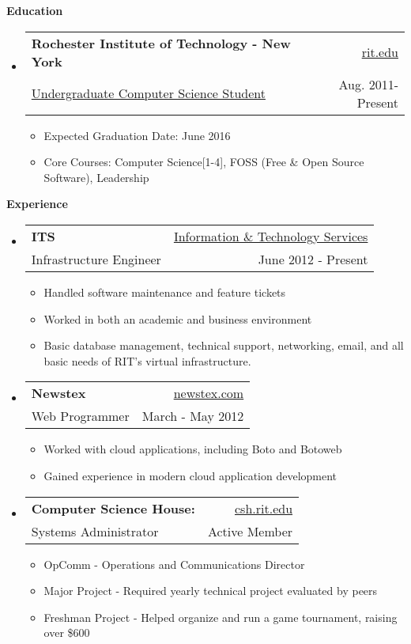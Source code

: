 \documentclass[letterpaper,11pt]{article}
\makeatletter
\newcommand{\resitem}[1]{\item #1 \vspace{-2pt}}
\newcommand{\resheading}[1]{{\large \colorbox{mygrey}{\begin{minipage}{\textwidth}{\textbf{#1 \vphantom{p\^{E}}}}\end{minipage}}}}
\newcommand{\ressubheading}[4]{
\begin{tabular*}{6.5in}{l@{\extracolsep{\fill}}r}
		\textbf{#1} & #2 \\
		{#3} & {#4} \\
\end{tabular*}\vspace{-6pt}}
\makeatother
\begin{document}
\resheading{Education}
	{ \footnotesize
	\begin{itemize}
		\item
			\ressubheading{Rochester Institute of Technology - New York}{\href{http://www.rit.edu/}{rit.edu}}{\href{http://www.cs.rit.edu/}{Undergraduate Computer Science Student}}{Aug. 2011-Present}
				{ \footnotesize
				\begin{itemize}
					\item{Expected Graduation Date: June 2016}
					\item{Core Courses: Computer Science[1-4], FOSS (Free \& Open Source Software), Leadership}
				\end{itemize}
				}
	\end{itemize} %
	}
\resheading{Experience}
{\footnotesize
	\begin{itemize}
			\item 
			\ressubheading{ITS}{\href{http://www.rit.edu/its/}{Information \& Technology Services}}{Infrastructure Engineer}{June 2012 - Present}
			{ \footnotesize
				\begin{itemize}
					\item{Handled software maintenance and feature tickets}
					\item{Worked in both an academic and business environment}
					\item{Basic database management, technical support, networking, email, and all basic needs of RIT's virtual infrastructure.}
				\end{itemize}
			}
		\item	
			\ressubheading{Newstex}{\href{http://www.newstex.com/}{newstex.com}}{Web Programmer}{March - May 2012} 
				{ \footnotesize 
				\begin{itemize}
					\item{Worked with cloud applications, including Boto and Botoweb}
					\item{Gained experience in modern cloud application development}
				\end{itemize}
				}
		\item 
			\ressubheading{Computer Science House:}{\href{http://www.csh.rit.edu/}{csh.rit.edu}}{Systems Administrator}{Active Member} 
			{ \footnotesize
				\begin{itemize}		
					\resitem{{OpComm} - Operations and Communications Director}
					\resitem{{Major Project} - Required yearly technical project evaluated by peers}
					\resitem{{Freshman Project} - Helped organize and run a game tournament, raising over \$600} 
					
				\end{itemize}
			}		
	\end{itemize}  %
}
\end{document}
